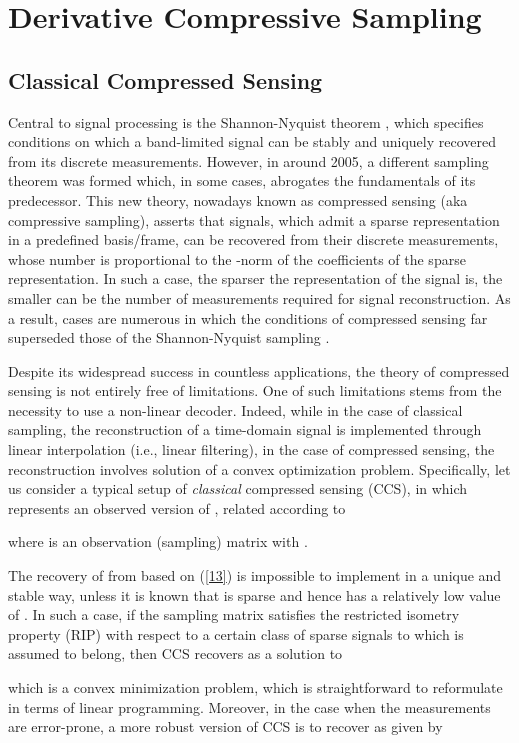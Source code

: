 \pdfoutput=1 \documentclass[journal]{IEEEtran}
\begin{document}
\section{Derivative Compressive Sampling}
\subsection{Classical Compressed Sensing}
Central to signal processing is the Shannon-Nyquist theorem \cite{45}, which specifies conditions on which a band-limited signal can be stably and uniquely recovered from its discrete measurements. However, in around 2005, a different sampling theorem was formed which, in some cases, abrogates the fundamentals of its predecessor. This new theory, nowadays known as compressed sensing (aka compressive sampling), asserts that signals, which admit a sparse representation in a predefined basis/frame, can be recovered from their discrete measurements, whose number is proportional to the -norm of the coefficients of the sparse representation. In such a case, the sparser the representation of the signal is, the smaller can be the number of  measurements required for signal reconstruction. As a result, cases are numerous in which the conditions of compressed sensing far superseded those of the Shannon-Nyquist sampling \cite{4, 13}.

Despite its widespread success in countless applications, the theory of compressed sensing is not entirely free of limitations. One of such limitations stems from the necessity to use a non-linear decoder. Indeed, while in the case of classical sampling, the reconstruction of a time-domain signal is implemented through linear interpolation (i.e., linear filtering), in the case of compressed sensing, the reconstruction involves solution of a convex optimization problem. Specifically, let us consider a typical setup of {\em classical} compressed sensing (CCS), in which  represents an observed version of , related according to

where  is an observation (sampling) matrix with .

The recovery of  from  based on (\ref{13}) is impossible to implement in a unique and stable way, unless it is known that  is sparse and hence has a relatively low value of . In such a case, if the sampling matrix  satisfies the restricted isometry property (RIP) \cite{4, 13} with respect to a certain class of sparse signals to which  is assumed to belong, then CCS recovers  as a solution to \cite{20, 21}

which is a convex minimization problem, which is straightforward to reformulate in terms of linear programming. Moreover, in the case when the measurements  are error-prone, a more robust version of CCS is to recover  as given by
\end{document}
